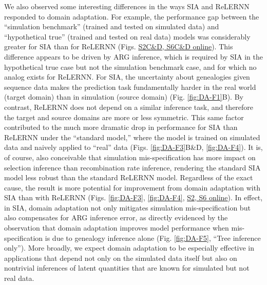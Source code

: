 We also observed some interesting differences in the ways \ac{SIA} and ReLERNN responded to domain adaptation. For example, the performance gap between the “simulation benchmark” (trained and tested on simulated data) and “hypothetical true” (trained and tested on real data) models was considerably greater for \ac{SIA} than for ReLERNN (Figs. \href{https://journals.plos.org/plosgenetics/article?id=10.1371/journal.pgen.1011032#sec018}{S2C\&D, S6C\&D online}). This difference appears to be driven by \ac{ARG} inference, which is required by \ac{SIA} in the hypothetical true case but not the simulation benchmark case, and for which no analog exists for ReLERNN. For \ac{SIA}, the uncertainty about genealogies given sequence data makes the prediction task fundamentally harder in the real world (target domain) than in simulation (source domain) (Fig. \ref{fig:DA-F1}B). By contrast, ReLERNN does not depend on a similar inference task, and therefore the target and source domains are more or less symmetric. This same factor contributed to the much more dramatic drop in performance for \ac{SIA} than ReLERNN under the “standard model,” where the model is trained on simulated data and naively applied to “real” data (Figs. \ref{fig:DA-F3}B\&D, \ref{fig:DA-F4}). It is, of course, also conceivable that simulation mis-specification has more impact on selection inference than recombination rate inference, rendering the standard \ac{SIA} model less robust than the standard ReLERNN model. Regardless of the exact cause, the result is more potential for improvement from domain adaptation with \ac{SIA} than with ReLERNN (Figs. \ref{fig:DA-F3}, \ref{fig:DA-F4}, \href{https://journals.plos.org/plosgenetics/article?id=10.1371/journal.pgen.1011032#sec018}{S2, S6 online}). In effect, in \ac{SIA}, domain adaptation not only mitigates simulation mis-specification but also compensates for \ac{ARG} inference error, as directly evidenced by the observation that domain adaptation improves model performance when mis-specification is due to genealogy inference alone (Fig. \ref{fig:DA-F5}, “Tree inference only”). More broadly, we expect domain adaptation to be especially effective in applications that depend not only on the simulated data itself but also on nontrivial inferences of latent quantities that are known for simulated but not real data.

